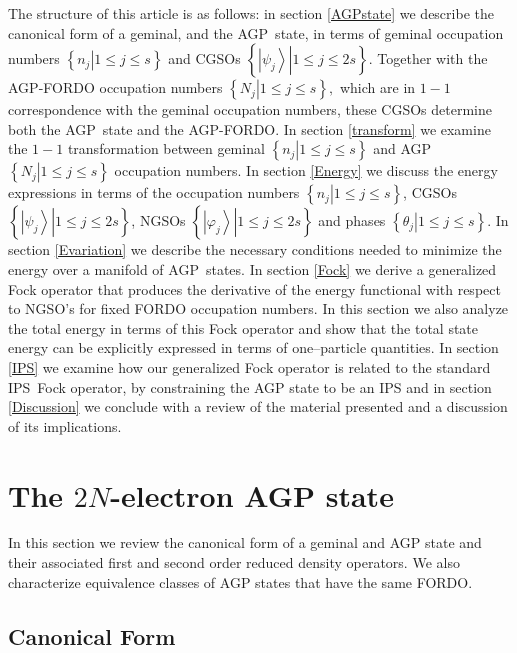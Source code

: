 \documentclass[aps,preprint]{revtex4}%
\begin{document}
The structure of this article is as follows: in section \ref{AGPstate} we
describe the canonical form of a geminal, and the AGP\ state, in terms of
geminal occupation numbers $\left\{  \left.  n_{j}\right\vert 1\leq j\leq
s\right\}  $ and CGSOs $\left\{  \left.  \left\vert \psi_{j}\right\rangle
\right\vert 1\leq j\leq2s\right\}  .$ Together with the AGP-FORDO occupation
numbers $\left\{  \left.  N_{j}\right\vert 1\leq j\leq s\right\}  ,$ which are
in $1-1$ correspondence with the geminal occupation numbers, these CGSOs
determine both the AGP\ state and the AGP-FORDO. In section \ref{transform} we
examine the $1-1$ transformation between geminal $\left\{  \left.
n_{j}\right\vert 1\leq j\leq s\right\}  $ and AGP $\left\{  \left.
N_{j}\right\vert 1\leq j\leq s\right\}  $ occupation numbers. In section
\ref{Energy} we discuss the energy expressions in terms of the occupation
numbers $\left\{  \left.  n_{j}\right\vert 1\leq j\leq s\right\}  $, CGSOs
$\left\{  \left.  \left\vert \psi_{j}\right\rangle \right\vert 1\leq
j\leq2s\right\}  $, NGSOs $\left\{  \left.  \left\vert \varphi_{j}%
\right\rangle \right\vert 1\leq j\leq2s\right\}  $ and phases $\left\{
\left.  \theta_{j}\right\vert 1\leq j\leq s\right\}  .$ In section
\ref{Evariation} we describe the necessary conditions needed to minimize the
energy over a manifold of AGP\ states. In section \ref{Fock} we derive a
generalized Fock operator that produces the derivative of the energy
functional with respect to NGSO's for fixed FORDO occupation numbers. In this
section we also analyze the total energy in terms of this Fock operator and
show that the total state energy can be explicitly expressed in terms of
one--particle quantities. In section \ref{IPS} we examine how our generalized
Fock operator is related to the standard IPS\ Fock operator, by constraining
the AGP state to be an IPS and in section \ref{Discussion} we conclude with a
review of the material presented and a discussion of its implications.

\section{The $2N$-electron AGP state\label{AGPstate}}

In this section we review the canonical form of a geminal and AGP state and
their associated first and second order reduced density operators. We also
characterize equivalence classes of AGP states that have the same FORDO.

\subsection{Canonical Form}
\end{document}
